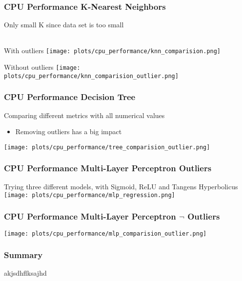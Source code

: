 \documentclass[aspectratio=169]{beamer}
\begin{document}
\begin{frame}{}
\frametitle{CPU Performance K-Nearest Neighbors}
\center Only small K since data set is too small\\ ~\\
\begin{minipage}{0.49\textwidth}
\center With outliers
   \texttt{[image: plots/cpu\_performance/knn\_comparision.png]}
\end{minipage}
 \begin{minipage}{0.49\textwidth}
 \center Without outliers
   \texttt{[image: plots/cpu\_performance/knn\_comparision\_outlier.png]}
\end{minipage}
\end{frame}

\begin{frame}{}
\frametitle{CPU Performance Decision Tree}
\center Comparing different metrics with all numerical values\\
\begin{minipage}{0.3\textwidth}
	\begin{itemize}
	\item Removing outliers has a big impact
	\end{itemize}
\end{minipage}
\begin{minipage}{0.69\textwidth}
  \center \texttt{[image: plots/cpu\_performance/tree\_comparision\_outlier.png]}
\end{minipage}
\end{frame}

\begin{frame}{}
\frametitle{CPU Performance Multi-Layer Perceptron Outliers}
\center Trying three different models, with Sigmoid, ReLU and Tangens Hyperbolicus
    \center \texttt{[image: plots/cpu\_performance/mlp\_regression.png]}
\end{frame}

\begin{frame}{}
\frametitle{CPU Performance Multi-Layer Perceptron $\neg$ Outliers}
    \center \texttt{[image: plots/cpu\_performance/mlp\_comparision\_outlier.png]}
\end{frame}

\begin{frame}{}
\frametitle{Summary}
akjsdhflksajhd
\end{frame}
\end{document}
